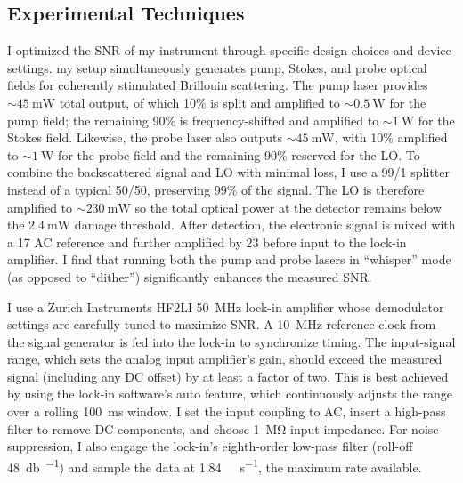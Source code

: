 \subsection{Experimental Techniques}
\label{Methods:Experimental Techniques}
I optimized the \ac{SNR} of my instrument through specific design choices and device settings. my setup simultaneously generates pump, Stokes, and probe optical fields for coherently stimulated Brillouin scattering. The pump laser provides \(\sim\!\SI{45}{\milli\watt}\) total output, of which 10\% is split and amplified to \(\sim\!\SI{0.5}{\watt}\) for the pump field; the remaining 90\% is frequency-shifted and amplified to \(\sim\!\SI{1}{\watt}\) for the Stokes field. Likewise, the probe laser also outputs \(\sim\!\SI{45}{\milli\watt}\), with 10\% amplified to \(\sim\!\SI{1}{\watt}\) for the probe field and the remaining 90\% reserved for the \ac{LO}. To combine the backscattered signal and \ac{LO} with minimal loss, I use a 99/1 splitter instead of a typical 50/50, preserving 99\% of the signal. The \ac{LO} is therefore amplified to \(\sim\!\SI{230}{\milli\watt}\) so the total optical power at the detector remains below the \(\SI{2.4}{\milli\watt}\) damage threshold. After detection, the electronic signal is mixed with a \SI{17}{\dBm} \ac{AC} reference and further amplified by \SI{23}{\dBm} before input to the lock-in amplifier. I find that running both the pump and probe lasers in “whisper” mode (as opposed to “dither”) significantly enhances the measured SNR.

I use a Zurich Instruments HF2LI \SI{50}{\mega\hertz} lock-in amplifier whose demodulator settings are carefully tuned to maximize \ac{SNR}. A \SI{10}{\mega\hertz} reference clock from the signal generator is fed into the lock-in to synchronize timing. The input-signal range, which sets the analog input amplifier’s gain, should exceed the measured signal (including any \ac{DC} offset) by at least a factor of two. This is best achieved by using the lock-in software’s auto feature, which continuously adjusts the range over a rolling \SI{100}{\milli\second} window. I set the input coupling to \ac{AC}, insert a high-pass filter to remove \ac{DC} components, and choose \SI{1}{\mega\ohm} input impedance. For noise suppression, I also engage the lock-in’s eighth-order low-pass filter (roll-off \SI{48}{\decibel\per\octave}) and sample the data at \SI{1.84}{\mega\sample\per\second}, the maximum rate available.

